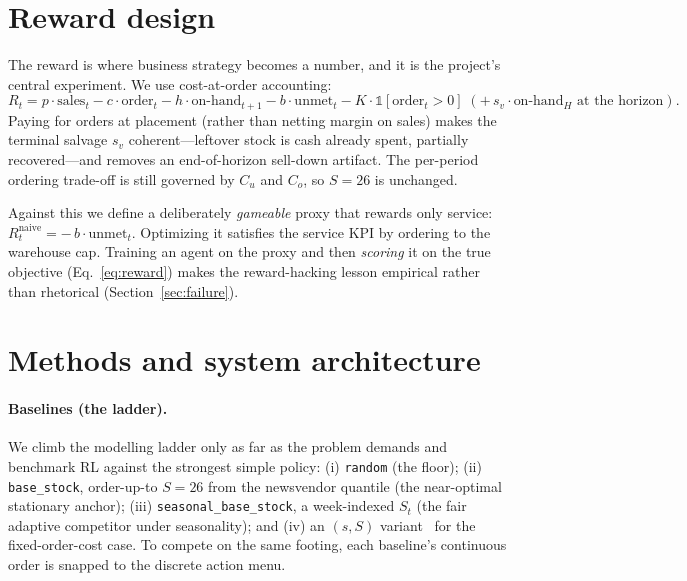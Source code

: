 \documentclass[11pt]{article}
\begin{document}
\section{Reward design}
\label{sec:reward}

The reward is where business strategy becomes a number, and it is the project's central
experiment. We use cost-at-order accounting:
\begin{equation}
  R_t = p\cdot \text{sales}_t - c\cdot \text{order}_t - h\cdot \text{on-hand}_{t+1}
        - b\cdot \text{unmet}_t - K\cdot \mathbb{1}[\text{order}_t>0]
        \;(+\, s_v\cdot \text{on-hand}_H \text{ at the horizon}).
  \label{eq:reward}
\end{equation}
Paying for orders at placement (rather than netting margin on sales) makes the terminal salvage
$s_v$ coherent---leftover stock is cash already spent, partially recovered---and removes an
end-of-horizon sell-down artifact. The per-period ordering trade-off is still governed by
$C_u$ and $C_o$, so $S=26$ is unchanged.

Against this we define a deliberately \emph{gameable} proxy that rewards only service:
$R^{\text{naive}}_t = -\,b\cdot \text{unmet}_t$. Optimizing it satisfies the service KPI by
ordering to the warehouse cap. Training an agent on the proxy and then \emph{scoring} it on the
true objective (Eq.~\eqref{eq:reward}) makes the reward-hacking lesson empirical rather than
rhetorical (Section~\ref{sec:failure}).

\section{Methods and system architecture}
\label{sec:methods}

\paragraph{Baselines (the ladder).}
We climb the modelling ladder only as far as the problem demands and benchmark RL against the
strongest simple policy: (i) \texttt{random} (the floor); (ii) \texttt{base\_stock}, order-up-to
$S=26$ from the newsvendor quantile (the near-optimal stationary anchor); (iii)
\texttt{seasonal\_base\_stock}, a week-indexed $S_t$ (the fair adaptive competitor under
seasonality); and (iv) an $(s,S)$ variant~\cite{zhengfedergruen} for the fixed-order-cost case. To compete on the same
footing, each baseline's continuous order is snapped to the discrete action menu.
\end{document}
